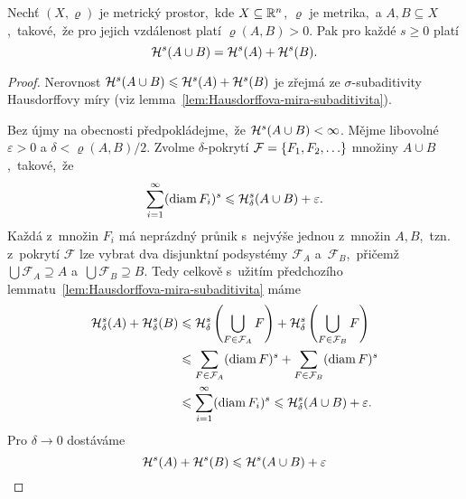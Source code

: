\begin{lemma}\label{lem:hausdorffova-mira-sigma-aditivita-kladna-vzdalenost}
    Nechť $(X,\varrho)$ je metrický prostor,~kde $X\subseteq\mathbb{R}^n$, $\varrho$ je metrika,~a $A,B\subseteq X$,~takové,~že pro jejich vzdálenost platí $\varrho(A,B)>0$. Pak pro každé $s\geqslant 0$ platí
    \[\mathcal{H}^{s}(A\cup B)=\mathcal{H}^{s}(A)+\mathcal{H}^{s}(B).\]
\end{lemma}
\begin{proof}
    Nerovnost $\mathcal{H}^{s}(A\cup B)\leqslant\mathcal{H}^{s}(A)+\mathcal{H}^{s}(B)$ je zřejmá ze $\sigma$-subaditivity Hausdorffovy míry (viz lemma~\ref{lem:Hausdorffova-mira-subaditivita}).

    Bez újmy na obecnosti předpokládejme,~že $\mathcal{H}^{s}(A\cup B)<\infty$. Mějme libovolné $\varepsilon>0$ a $\delta<\varrho(A,B)/2$. Zvolme $\delta$-pokrytí $\mathcal{F}=\left\{F_1,F_2,\ldots\right\}$ množiny $A\cup B$,~takové,~že
    \[\sum_{i=1}^{\infty}(\operatorname{diam}{F_i})^s\leqslant\mathcal{H}_{\delta}^{s}(A\cup B)+\varepsilon.\]
    Každá z~množin $F_i$ má neprázdný průnik s~nejvýše jednou z~množin $A,B$,~tzn. z~pokrytí $\mathcal{F}$ lze vybrat dva disjunktní podsystémy $\mathcal{F}_A$ a~$\mathcal{F}_B$,~přičemž $\bigcup\mathcal{F}_A\supseteq A$ a~$\bigcup\mathcal{F}_B\supseteq B$. Tedy celkově s~užitím předchozího lemmatu~\ref{lem:Hausdorffova-mira-subaditivita} máme
    \begin{align*}
        \mathcal{H}_{\delta}^{s}(A)+\mathcal{H}_{\delta}^{s}(B)&\leqslant\mathcal{H}_{\delta}^{s}\left(\bigcup_{F\in\mathcal{F}_A}F\right)+\mathcal{H}_{\delta}^{s}\left(\bigcup_{F\in\mathcal{F}_B}F\right)\\
        &\leqslant\sum_{F\in\mathcal{F}_A}(\operatorname{diam}{F})^s+\sum_{F\in\mathcal{F}_B}(\operatorname{diam}{F})^s\\
        &\leqslant\sum_{i=1}^{\infty}(\operatorname{diam}{F_i})^s\leqslant\mathcal{H}_{\delta}^{s}(A\cup B)+\varepsilon.
    \end{align*}
    Pro $\delta\to 0$ dostáváme
    \[\mathcal{H}^{s}(A)+\mathcal{H}^{s}(B)\leqslant\mathcal{H}^{s}(A\cup B)+\varepsilon\]
\end{proof}

